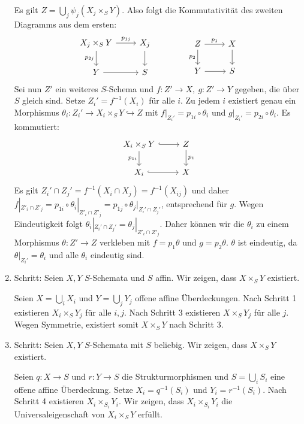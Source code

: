 \begin{enumerate}
Es gilt $Z=\bigcup_j\psi_j(X_j\times_SY)$. Also folgt die Kommutativität des zweiten Diagramms aus dem ersten:
\[\begin{tikzcd}
X_j\times_S Y\ar[r, "p_{1j}"]\ar[d, "p_{2j}"'] & X_j\ar[d]\\
Y\ar[r] & S
\end{tikzcd}\qquad\qquad \begin{tikzcd}
Z\ar[d, "p_2"']\ar[r, "p_1"] & X\ar[d]\\
Y\ar[r] & S
\end{tikzcd}\]
Sei nun $Z'$ ein weiteres $S$-Schema und $f:Z'\to X,\ g:Z'\to Y$ gegeben, die über $S$ gleich sind. Setze $Z_i'=f^{-1}(X_i)$ für alle $i$. Zu jedem $i$ existiert genau ein Morphismus ${\theta}_i:Z_i'\to X_i\times_SY\hookrightarrow Z$ mit $f|_{Z_i'}=p_{1i}\circ{\theta}_i$ und $g|_{Z_i'}=p_{2i}\circ{\theta}_i$. Es kommutiert:
\[\begin{tikzcd}
X_i\times_SY\ar[r, hook]\ar[d, "p_{1i}"'] & Z\ar[d, "p_1"]\\
X_i\ar[r, hook] & X
\end{tikzcd} \]
Es gilt $Z_i'\cap Z_j'=f^{-1}(X_i\cap X_j)=f^{-1}(X_{ij})$ und daher $f|_{Z'_i\cap Z'_j}=p_{1i}\circ\theta_i|_{Z'_i\cap Z'_j}=p_{1j}\circ\theta_j|_{Z_i'\cap Z_j'}$, entsprechend für $g$. Wegen Eindeutigkeit folgt $\theta_i|_{Z_i'\cap Z_j'}=\theta_j|_{Z'_i\cap Z'_j}$. Daher können wir die $\theta_i$ zu einem Morphismus $\theta:Z'\to Z$ verkleben mit $f=p_1\theta$ und $g=p_2\theta$. $\theta$ ist eindeutig, da $\theta|_{Z_i'}=\theta_i$ und alle $\theta_i$ eindeutig sind.
\item Schritt: Seien $X,Y$ $S$-Schemata und $S$ affin. Wir zeigen, dass $X\times_SY$ existiert.

Seien $X=\bigcup_iX_i$ und $Y=\bigcup_jY_j$ offene affine Überdeckungen. Nach Schritt 1 existieren $X_i\times_S Y_j$ für alle $i,j$. Nach Schritt 3 existieren $X\times_SY_j$ für alle $j$. Wegen Symmetrie, existiert somit $ X\times_SY$ nach Schritt 3.
\item Schritt: Seien $X,Y$ $S$-Schemata mit $S$ beliebig. Wir zeigen, dass $X\times_SY$ existiert.

Seien $q:X\to S$ und $r:Y\to S$ die Strukturmorphismen und $S=\bigcup_iS_i$ eine offene affine Überdeckung. Setze $X_i=q^{-1}(S_i)$ und $Y_i=r^{-1}(S_i)$. Nach Schritt 4 existieren $X_i\times_{S_i}Y_i$. Wir zeigen, dass $X_i\times_{S_i}Y_i$ die Universaleigenschaft von $X_i\times_SY$ erfüllt.


\end{enumerate}

